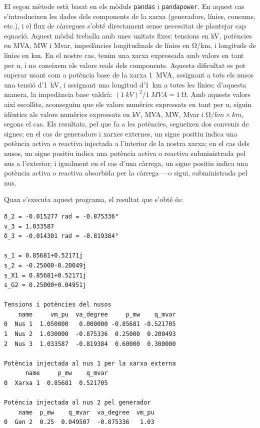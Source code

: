El segon mètode està basat en els mòduls \texttt{pandas} i \texttt{pandapower}. En aquest cas s'introdueixen les dades dels components de la xarxa (generadors, línies, consums, etc.), i el flux de càrregues s'obté directament sense necessitat de plantejar cap equació. Aquest mòdul treballa amb unes unitats fixes: tensions en  \unit{kV}, potències en  \unit{MVA}, \unit{MW} i \unit{Mvar}, impedàncies longitudinals de línies en \unit{\ohm/km}, i longituds de línies en  \unit{km}. En el nostre cas, tenim una xarxa expressada amb valors en tant per u, i no coneixem els valors reals dels components. Aquesta dificultat es pot superar usant com a potència base de la xarxa \qty{1}{MVA}, assignant a tots els nusos una tensió d'\qty{1}{kV}, i assignant una longitud d'\qty{1}{km} a totes les línies; d'aquesta manera, la impedància base valdrà: $(\qty{1}{kV})^2/\qty{1}{MVA} = \qty{1}{\ohm}$. Amb aquests valors així escollits, aconseguim que els valors numèrics expressats en tant per u, siguin idèntics als valors numèrics expressats en
\unit{kV},  \unit{MVA}, \unit{MW}, \unit{Mvar} i $\unit{\ohm/km}\times\unit{km}$, segons el cas. Els resultats, pel que fa a les potències,  segueixen dos convenis de signes; en el cas de generadors i xarxes externes, un signe positiu indica una potència activa o reactiva injectada a l'interior de la nostra xarxa; en el cas dels nusos, un signe positiu indica una potència activa o reactiva subministrada pel nus a l'exterior; i igualment en el cas d'una càrrega, un signe positiu indica una potència activa o reactiva absorbida per la càrrega ---o sigui, subministrada  pel nus.


Quan s'executa aquest programa, el resultat que s'obté és:
\lstset{
	language=,
	numbers=none,
	frame=none
}
\begin{lstlisting}
δ_2 = -0.015277 rad = -0.875336°
v_3 = 1.033587
δ_3 = -0.014301 rad = -0.819384°

s_1 = 0.85681+0.52171j
s_2 = -0.25000-0.20049j
s_X1 = 0.85681+0.52171j
s_G2 = 0.25000+0.04951j

Tensions i potències del nusos
    name     vm_pu  va_degree     p_mw    q_mvar
0  Nus 1  1.050000   0.000000 -0.85681 -0.521705
1  Nus 2  1.030000  -0.875336  0.25000  0.200493
2  Nus 3  1.033587  -0.819384  0.60000  0.300000

Potència injectada al nus 1 per la xarxa externa
      name     p_mw    q_mvar
0  Xarxa 1  0.85681  0.521705

Potència injectada al nus 2 pel generador
    name  p_mw    q_mvar  va_degree  vm_pu
0  Gen 2  0.25  0.049507  -0.875336   1.03
\end{lstlisting} 


